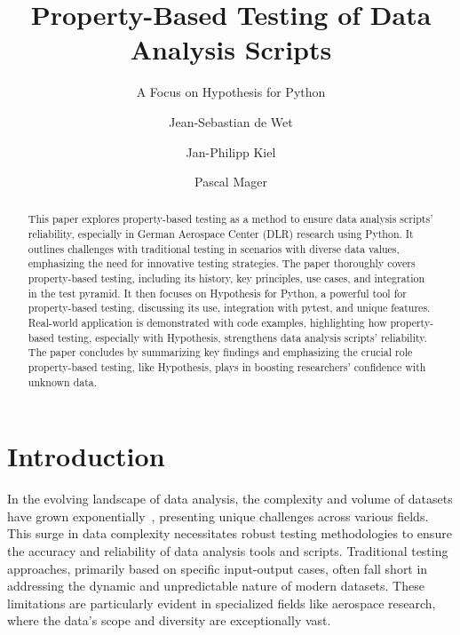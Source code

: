 \documentclass[runningheads]{llncs}
\begin{document}
%
\title{Property-Based Testing of Data Analysis Scripts}
\subtitle{A Focus on Hypothesis for Python}
%
%
\author{Jean-Sebastian de Wet \and
  Jan-Philipp Kiel \and
  Pascal Mager}
%
%
%
\maketitle              %
%
\begin{abstract}
  This paper explores property-based testing as a method to ensure data analysis scripts' reliability, especially in German Aerospace Center (DLR) research using Python. It outlines challenges with traditional testing in scenarios with diverse data values, emphasizing the need for innovative testing strategies. The paper thoroughly covers property-based testing, including its history, key principles, use cases, and integration in the test pyramid. It then focuses on Hypothesis for Python, a powerful tool for property-based testing, discussing its use, integration with pytest, and unique features. Real-world application is demonstrated with code examples, highlighting how property-based testing, especially with Hypothesis, strengthens data analysis scripts' reliability. The paper concludes by summarizing key findings and emphasizing the crucial role property-based testing, like Hypothesis, plays in boosting researchers' confidence with unknown data.

\end{abstract}
%
%
%
\section{Introduction}
In the evolving landscape of data analysis, the complexity and volume of datasets have grown exponentially~\cite{Taylor2023}, presenting unique challenges across various fields. This surge in data complexity necessitates robust testing methodologies to ensure the accuracy and reliability of data analysis tools and scripts. Traditional testing approaches, primarily based on specific input-output cases, often fall short in addressing the dynamic and unpredictable nature of modern datasets. These limitations are particularly evident in specialized fields like aerospace research, where the data's scope and diversity are exceptionally vast.
\end{document}

